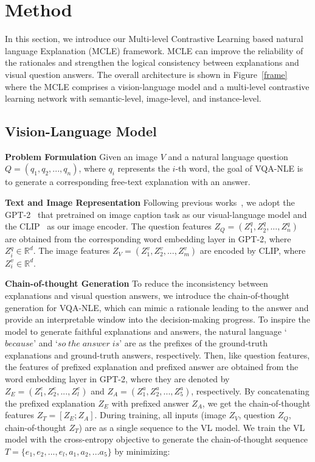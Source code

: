 \documentclass[letterpaper]{article} %
\begin{document}
\section{Method}
In this section, we introduce our Multi-level Contrastive Learning based natural language Explanation (MCLE) framework. MCLE can improve the reliability of the rationales and strengthen the logical consistency between explanations and visual question answers. The overall architecture is shown in Figure~\ref{frame} where the MCLE comprises a vision-language model and a multi-level contrastive learning network with semantic-level, image-level, and instance-level.

\subsection{Vision-Language Model}\label{vl}

\noindent
\textbf{Problem Formulation} Given an image $V$ and a natural language question $Q=(q_1,q_2,...,q_n)$, where $q_i$ represents the $i$-th word, the goal of VQA-NLE is to generate a corresponding free-text explanation with an answer.

\noindent
\textbf{Text and Image Representation} Following previous works~\cite{sammani2022nlx}, we adopt the GPT-2~\cite{radford2019language} that pretrained on image caption task as our visual-language model and the CLIP~\cite{radford2021learning} as our image encoder. The question features $Z_Q=(Z^q_1,Z^q_2,...,Z^q_n)$ are obtained from the corresponding word embedding layer in GPT-2, where $Z^q_i\in \mathbb{R}^{d}$. The image features $Z_V=(Z^v_1,Z^v_2,...,Z^v_m)$ are encoded by CLIP, where $Z^v_i\in \mathbb{R}^{d}$.

\noindent
\textbf{Chain-of-thought Generation} To reduce the inconsistency between explanations and visual question answers, we introduce the chain-of-thought generation for VQA-NLE, which can mimic a rationale leading to the answer and provide an interpretable window into the decision-making progress. To inspire the model to generate faithful explanations and answers, the natural language `$because$' and `$so\;the\;answer\;is$' are as the prefixes of the ground-truth explanations and ground-truth answers, respectively. Then, like question features, the features of prefixed explanation and prefixed answer are obtained from the word embedding layer in GPT-2, where they are denoted by $Z_E=(Z^e_1,Z^e_2,...,Z^e_l)$ and $Z_A=(Z^a_1,Z^a_2,...,Z^a_5)$, respectively. By concatenating the prefixed explanation $Z_E$ with prefixed answer $Z_A$, we get the chain-of-thought features $Z_T=[Z_E;Z_A]$.  During training, all inputs (image $Z_V$, question $Z_Q$, chain-of-thought $Z_T$) are as a single sequence to the VL model. We train the VL model with the cross-entropy objective to generate the chain-of-thought sequence ${T} =  \{e_1,e_2,...,e_l,a_1,a_2,...a_5\}$ by minimizing:
\end{document}
